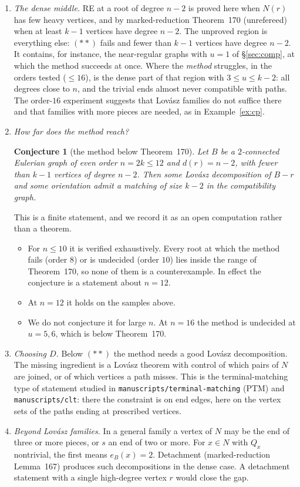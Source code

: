 \documentclass[11pt]{amsart}
\newtheorem{conjecture}[theorem]{Conjecture}
\theoremstyle{definition}
\begin{document}
\begin{enumerate}[leftmargin=*]
\item \emph{The dense middle.} RE at a root of degree $n-2$ is proved here when $N(r)$ has few heavy
vertices, and by marked-reduction Theorem~170 (unrefereed) when at least $k-1$ vertices have degree
$n-2$. The unproved region is everything else: $(\ast\ast)$ fails and fewer than $k-1$ vertices have
degree $n-2$. It contains, for instance, the near-regular graphs with $u=1$ of \S\ref{sec:comp}, at
which the method succeeds at once. Where the \emph{method} struggles, in the orders tested ($\le16$),
is the dense part of that region with $3\le u\le k-2$: all degrees close to $n$, and the trivial ends
almost never compatible with paths. The order-$16$ experiment suggests that Lov\'asz families do not
suffice there and that families with more pieces are needed, as in Example~\ref{ex:cp}.
\item \emph{How far does the method reach?}
\begin{conjecture}[the method below Theorem~170]\label{conj:mid}
Let $B$ be a $2$-connected Eulerian graph of even order $n=2k\le 12$ and $d(r)=n-2$, with fewer than
$k-1$ vertices of degree $n-2$. Then some Lov\'asz decomposition of $B-r$ and some orientation admit
a matching of size $k-2$ in the compatibility graph.
\end{conjecture}
This is a finite statement, and we record it as an open computation rather than a theorem.
\begin{itemize}[leftmargin=*]
\item For $n\le10$ it is verified exhaustively. Every root at which the method fails (order $8$) or is
undecided (order $10$) lies inside the range of Theorem~170, so none of them is a counterexample. In
effect the conjecture is a statement about $n=12$.
\item At $n=12$ it holds on the samples above.
\item We do not conjecture it for large $n$. At $n=16$ the method is undecided at $u=5,6$, which is
below Theorem~170.
\end{itemize}
\item \emph{Choosing $D$.} Below $(\ast\ast)$ the method needs a good Lov\'asz decomposition. The
missing ingredient is a Lov\'asz theorem with control of which pairs of $N$ are joined, or of which
vertices a path misses. This is the terminal-matching type of statement studied in
\texttt{manuscripts/terminal-matching} (PTM) and \texttt{manuscripts/clt}: there the constraint is on
end edges, here on the vertex sets of the paths ending at prescribed vertices.
\item \emph{Beyond Lov\'asz families.} In a general family a vertex of $N$ may be the end of three or
more pieces, or $s$ an end of two or more. For $x\in N$ with $Q_x$ nontrivial, the first means
$e_B(x)=2$.
Detachment (marked-reduction Lemma~167) produces such decompositions in the dense case. A
detachment statement with a single high-degree vertex $r$ would close the gap.
\end{enumerate}
\end{document}
